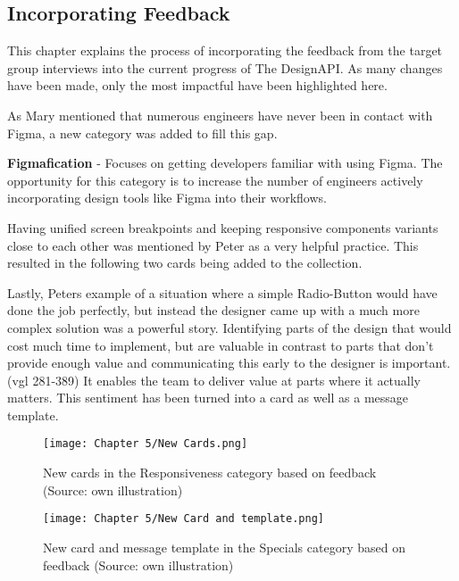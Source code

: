 \newpage
\subsection{Incorporating Feedback}
This chapter explains the process of incorporating the feedback from the target group interviews
into the current progress of The DesignAPI. As many changes have been made, only the most impactful
have been highlighted here.

As Mary mentioned that numerous engineers have never been in contact with Figma, a new category was
added to fill this gap.

\textbf{Figmafication} - Focuses on getting developers familiar with using Figma. The
opportunity for this category is to increase the number of engineers actively
incorporating design tools like Figma into their workflows.

Having unified screen breakpoints and keeping responsive components variants close to each other was
mentioned by Peter as a very helpful practice. This resulted in the following two cards being added
to the collection.

Lastly, Peters example of a situation where a simple Radio-Button would have done the job perfectly,
but instead the designer came up with a much more complex solution was a powerful story.
Identifying parts of the design that would cost much time to implement, but are valuable in contrast
to parts that don't provide enough value and communicating this early to the designer is important.
(vgl 281-389)
It enables the team to deliver value at parts where it actually matters. This sentiment has been
turned into a card as well as a message template.

\begin{figure}[H]
    \centering
    \texttt{[image: Chapter 5/New Cards.png]}
    \caption{New cards in the Responsiveness category based on feedback (Source: own illustration)}
\end{figure}

\begin{figure}[H]
    \centering
    \texttt{[image: Chapter 5/New Card and template.png]}
    \caption{New card and message template in the Specials category based on feedback (Source: own illustration)}
\end{figure}
